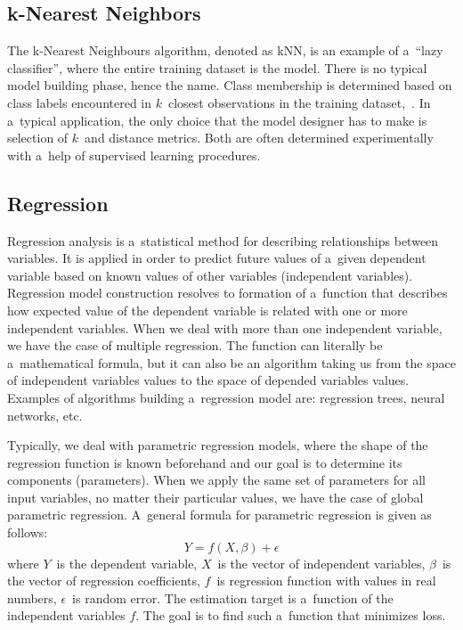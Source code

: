 \documentclass{llncs}
\begin{document}
\subsection{k-Nearest Neighbors}

The k-Nearest Neighbours algorithm, denoted as kNN, is an example of a~``lazy classifier'', where the entire training dataset is the model. There is no typical model building phase, hence the name. Class membership is determined based on class labels encountered in $k$~closest observations in the training dataset,~\cite{Altman1992}. In a~typical application, the only choice that the model designer has to make is selection of $k$~and distance metrics. Both are often determined experimentally with a~help of supervised learning procedures.


\subsection{Regression}
Regression analysis is a~statistical method for describing relationships between variables. It is applied in order to predict future values of a~given dependent variable based on known values of other variables (independent variables). Regression model construction resolves to formation of a~function that describes how expected value of the dependent variable is related with one or more independent variables. When we deal with more than one independent variable, we have the case of multiple regression. The function can literally be a~mathematical formula, but it can also be an algorithm taking us from the space of independent variables values to the space of depended variables values. Examples of algorithms building a~regression model are: regression trees, neural networks, etc.

Typically, we deal with parametric regression models, where the shape of the regression function is known beforehand and our goal is to determine its components (parameters). When we apply the same set of parameters for all input variables, no matter their particular values, we have the case of global parametric regression. A~general formula for parametric regression is given as follows:
  \vspace{-3pt}
\begin{equation} 
\label{eq:regression} 
Y = f(X, \beta) + \epsilon
\end{equation}
where $Y$~is the dependent variable, $X$~is the vector of independent variables, $\beta$~is the vector of regression coefficients, $f$~is  regression function with values in real numbers, $\epsilon$~is random error. The estimation target is a~function of the independent variables $f$. The goal is to find such a~function that minimizes loss. 
\end{document}

